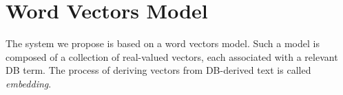 

\section{Word Vectors Model}\label{sec:latent_wv_model}
The system we propose is based on a word vectors model. Such a model is composed of a collection of real-valued vectors, each associated with a relevant DB term. The process of deriving vectors from DB-derived text is called \textit{embedding}. \\
